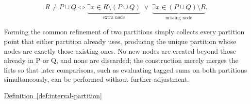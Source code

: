 \begin{remark*}
\[
R \ne P \cup Q
\Longleftrightarrow
\underbrace{\exists x \in R \setminus (P \cup Q)}_{\text{extra node}}
\;\lor\;
\underbrace{\exists x \in (P \cup Q) \setminus R}_{\text{missing node}}.
\]
\end{remark*}

\begin{remark*}[Interpretation]
Forming the common refinement of two partitions simply collects every partition point that either partition already uses, producing the unique partition whose nodes are exactly those existing ones. No new nodes are created beyond those already in P or Q, and none are discarded; the construction merely merges the lists so that later comparisons, such as evaluating tagged sums on both partitions simultaneously, can be performed without further adjustment.
\end{remark*}

\begin{dependencies}
\hyperref[def:interval-partition]{Definition~\ref*{def:interval-partition}}
\end{dependencies}
